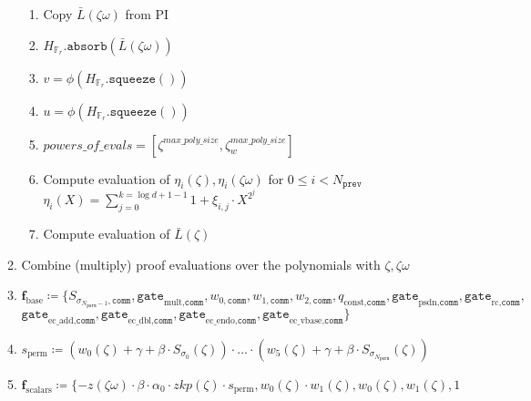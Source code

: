 \begin{algorithm}[H]
\begin{enumerate}
\begin{enumerate}
\begin{enumerate}
                \item Copy $\bar{L}(\zeta\omega)$ from PI
                \item $H_{\mathbb{F}_r}.\texttt{absorb}(\bar{L}(\zeta\omega))$
                \item $v = \phi(H_{\mathbb{F}_r}.\texttt{squeeze}())$
                \item $u = \phi(H_{\mathbb{F}_r}.\texttt{squeeze}())$
	       \item $powers\_of\_evals = [\zeta^{max\_poly\_size}, \zeta_w^{max\_poly\_size}]$
                \item Compute evaluation of $\eta_i(\zeta), \eta_i(\zeta\omega)$ for $0 \leq i < N_{\texttt{prev}}$ \\
			$\eta_i(X) = \sum_{j = 0}^{k = \log{d + 1} - 1}1 + \xi_{i, j} \cdot X^{2^j}$
                \item Compute evaluation of $\bar{L}(\zeta)$\footnotemark
            \end{enumerate}
   	  \item Combine (multiply) proof evaluations over the polynomials with $\zeta, \zeta\omega$
            \item $\textbf{f}_{\text{base}} \coloneqq
            	\{S_{\sigma_{N_{\texttt{perm}} - 1}, \texttt{comm}}, %
            	\texttt{gate}_{\text{mult}, \texttt{comm}}, w_{0, \texttt{comm}}, 
            	w_{1, \texttt{comm}}, w_{2, \texttt{comm}}, q_{\text{const}, \texttt{comm}}, %
            	\texttt{gate}_{\text{psdn}, \texttt{comm}}, \texttt{gate}_{\text{rc}, \texttt{comm}},$\\ %
            	$\texttt{gate}_{\text{ec\_add}, \texttt{comm}}, %
            	\texttt{gate}_{\text{ec\_dbl}, \texttt{comm}}, %
            	\texttt{gate}_{\text{ec\_endo}, \texttt{comm}}, %
            	\texttt{gate}_{\text{ec\_vbase}, \texttt{comm}} %
            	\}$
            \item $s_{\text{perm}} \coloneqq (w_0(\zeta) + \gamma + \beta \cdot S_{\sigma_0}(\zeta)) \cdot ...
            	\cdot (w_5(\zeta) + \gamma + \beta \cdot S_{\sigma_{N_{\texttt{perm}}}}(\zeta))$
            \item $\textbf{f}_{\text{scalars}} \coloneqq
            	\{-z(\zeta\omega) \cdot \beta \cdot \alpha_0 \cdot zkp(\zeta) \cdot s_{\text{perm}}, %
            	w_0(\zeta) \cdot w_1(\zeta), w_0(\zeta), w_1(\zeta), 1$ \\ %

\end{enumerate}
\end{enumerate}
\end{algorithm}
